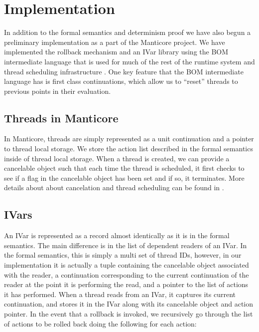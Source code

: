 \section{Implementation}
In addition to the formal semantics and determinism proof we have also begun a preliminary implementation as a part of the Manticore project.  We have implemented the rollback mechanism and an IVar library using the BOM intermediate language that is used for much of the rest of the runtime system and thread scheduling infrastructure \cite{sched-framework-for-parallel}. One key feature that the BOM intermediate language has is first class continuations, which allow us to ``reset'' threads to previous points in their evaluation.

\subsection{Threads in Manticore}
In Manticore, threads are simply represented as a unit continuation and a pointer to thread local storage.  We store the action list described in the formal semantics inside of thread local storage.  When a thread is created, we can provide a cancelable object such that each time the thread is scheduled, it first checks to see if a flag in the cancelable object has been set and if so, it terminates.  More details about about cancelation and thread scheduling can be found in \cite{implicit-threading-in-manticore:jfp}.


\subsection{IVars}
An IVar is represented as a record almost identically as it is in the formal semantics.  The main difference is in the list of dependent readers of an IVar.  In the formal semantics, this is simply a multi set of thread IDs, however, in our implementation it is actually a tuple containing the cancelable object associated with the reader, a continuation corresponding to the current continuation of the reader at the point it is performing the read, and a pointer to the list of actions it has performed.  When a thread reads from an IVar, it captures its current continuation, and stores it in the IVar along with its cancelable object and action pointer.  In the event that a rollback is invoked, we recursively go through the list of actions to be rolled back doing the following for each action:

